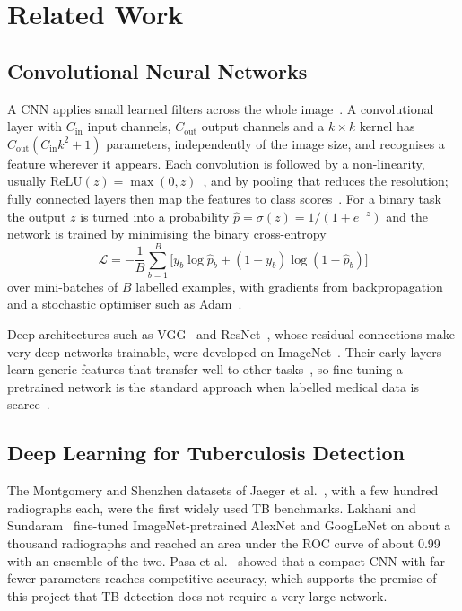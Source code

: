 \chapter{Related Work}
\label{ch:related}

\section{Convolutional Neural Networks}
\label{sec:rw_cnn}
A CNN applies small learned filters across the whole image~\cite{lecun1998}.
A convolutional layer with $C_{\mathrm{in}}$ input channels,
$C_{\mathrm{out}}$ output channels and a $k \times k$ kernel has
$C_{\mathrm{out}}(C_{\mathrm{in}}k^2 + 1)$ parameters, independently of the
image size, and recognises a feature wherever it appears. Each convolution
is followed by a non-linearity, usually $\mathrm{ReLU}(z) = \max(0,
z)$~\cite{nair2010}, and by pooling that reduces the resolution; fully
connected layers then map the features to class scores~\cite{goodfellow2016}.
For a binary task the output $z$ is turned into a probability
$\hat p = \sigma(z) = 1/(1+e^{-z})$ and the network is trained by minimising
the binary cross-entropy
\begin{equation}
\mathcal{L} = -\frac{1}{B}\sum_{b=1}^{B}\Big[y_b \log \hat{p}_b + (1-y_b)\log(1-\hat{p}_b)\Big]
\label{eq:bce}
\end{equation}
over mini-batches of $B$ labelled examples, with gradients from
backpropagation and a stochastic optimiser such as Adam~\cite{kingma2015}.

Deep architectures such as VGG~\cite{simonyan2015} and
ResNet~\cite{he2016}, whose residual connections make very deep networks
trainable, were developed on ImageNet~\cite{deng2009}. Their early layers
learn generic features that transfer well to other tasks~\cite{yosinski2014},
so fine-tuning a pretrained network is the standard approach when labelled
medical data is scarce~\cite{litjens2017}.

\section{Deep Learning for Tuberculosis Detection}
\label{sec:rw_tb}
The Montgomery and Shenzhen datasets of Jaeger et al.~\cite{jaeger2014}, with
a few hundred radiographs each, were the first widely used TB benchmarks.
Lakhani and Sundaram~\cite{lakhani2017} fine-tuned ImageNet-pretrained
AlexNet and GoogLeNet on about a thousand radiographs and reached an area
under the ROC curve of about 0.99 with an ensemble of the two. Pasa et
al.~\cite{pasa2019} showed that a compact CNN with far fewer parameters
reaches competitive accuracy, which supports the premise of this project
that TB detection does not require a very large network.

